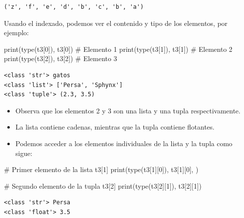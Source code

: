 \documentclass[
  spanish,
  letterpaper,
]{scrbook}
\newenvironment{Shaded}{\begin{snugshade}}{\end{snugshade}}
\newcommand{\BuiltInTok}[1]{\textcolor[rgb]{0.00,0.23,0.31}{#1}}
\newcommand{\CommentTok}[1]{\textcolor[rgb]{0.37,0.37,0.37}{#1}}
\newcommand{\DecValTok}[1]{\textcolor[rgb]{0.68,0.00,0.00}{#1}}
\newcommand{\NormalTok}[1]{\textcolor[rgb]{0.00,0.23,0.31}{#1}}
\providecommand{\tightlist}{%
  \setlength{\itemsep}{0pt}\setlength{\parskip}{0pt}}
\theoremstyle{definition}
\theoremstyle{remark}
\begin{document}
\begin{verbatim}
('z', 'f', 'e', 'd', 'b', 'c', 'b', 'a')
\end{verbatim}

Usando el indexado, podemos ver el contenido y tipo de los elementos,
por ejemplo:

\begin{Shaded}
\begin{Highlighting}[]
\BuiltInTok{print}\NormalTok{(}\BuiltInTok{type}\NormalTok{(t3[}\DecValTok{0}\NormalTok{]), t3[}\DecValTok{0}\NormalTok{]) }\CommentTok{\# Elemento 1}
\BuiltInTok{print}\NormalTok{(}\BuiltInTok{type}\NormalTok{(t3[}\DecValTok{1}\NormalTok{]), t3[}\DecValTok{1}\NormalTok{]) }\CommentTok{\# Elemento 2}
\BuiltInTok{print}\NormalTok{(}\BuiltInTok{type}\NormalTok{(t3[}\DecValTok{2}\NormalTok{]), t3[}\DecValTok{2}\NormalTok{]) }\CommentTok{\# Elemento 3}
\end{Highlighting}
\end{Shaded}

\begin{verbatim}
<class 'str'> gatos
<class 'list'> ['Persa', 'Sphynx']
<class 'tuple'> (2.3, 3.5)
\end{verbatim}

\begin{itemize}
\tightlist
\item
  Observa que los elementos 2 y 3 son una lista y una tupla
  respectivamente.
\item
  La lista contiene cadenas, mientras que la tupla contiene flotantes.
\item
  Podemos acceder a los elementos individuales de la lista y la tupla
  como sigue:
\end{itemize}

\begin{Shaded}
\begin{Highlighting}[]
\CommentTok{\# Primer elemento de la lista t3[1]}
\BuiltInTok{print}\NormalTok{(}\BuiltInTok{type}\NormalTok{(t3[}\DecValTok{1}\NormalTok{][}\DecValTok{0}\NormalTok{]), t3[}\DecValTok{1}\NormalTok{][}\DecValTok{0}\NormalTok{], )}

\CommentTok{\# Segundo elemento de la tupla t3[2]}
\BuiltInTok{print}\NormalTok{(}\BuiltInTok{type}\NormalTok{(t3[}\DecValTok{2}\NormalTok{][}\DecValTok{1}\NormalTok{]), t3[}\DecValTok{2}\NormalTok{][}\DecValTok{1}\NormalTok{])}
\end{Highlighting}
\end{Shaded}

\begin{verbatim}
<class 'str'> Persa
<class 'float'> 3.5
\end{verbatim}
\end{document}
